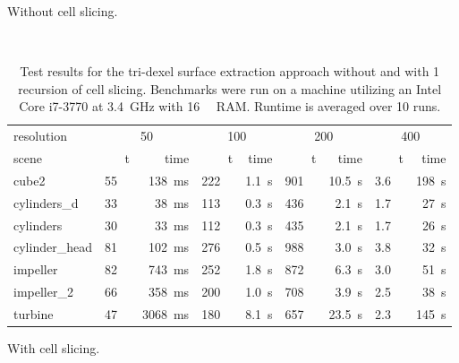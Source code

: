 \begin{table}
\begin{subtable}{\textwidth}
		\caption{
			Without cell slicing.
		}
		\label{tbl:tri_dexel_results_no_slicing}
	\end{subtable}
	\bigskip\\
	\begin{subtable}{\textwidth}
		\centering
		\begin{tabular}{l|rr|rr|rr|rr}
			resolution     & \multicolumn{2}{c}{50} & \multicolumn{2}{c}{100} & \multicolumn{2}{c}{200} & \multicolumn{2}{c}{400} \\
			scene          & t\sub{out} & time & t\sub{out} & time & t\sub{out} & time & t\sub{out} & time \\
			\midrule
			cube2          & \SI{55}{\kilo\nothing} & \SI{ 138}{\milli\second} & \SI{222}{\kilo\nothing} & \SI{1.1}{\second} & \SI{901}{\kilo\nothing} & \SI{10.5}{\second} & \SI{3.6}{\mega\nothing} & \SI{198}{\second} \\
			cylinders\_d   & \SI{33}{\kilo\nothing} & \SI{  38}{\milli\second} & \SI{113}{\kilo\nothing} & \SI{0.3}{\second} & \SI{436}{\kilo\nothing} & \SI{ 2.1}{\second} & \SI{1.7}{\mega\nothing} & \SI{ 27}{\second} \\
			cylinders      & \SI{30}{\kilo\nothing} & \SI{  33}{\milli\second} & \SI{112}{\kilo\nothing} & \SI{0.3}{\second} & \SI{435}{\kilo\nothing} & \SI{ 2.1}{\second} & \SI{1.7}{\mega\nothing} & \SI{ 26}{\second} \\
			cylinder\_head & \SI{81}{\kilo\nothing} & \SI{ 102}{\milli\second} & \SI{276}{\kilo\nothing} & \SI{0.5}{\second} & \SI{988}{\kilo\nothing} & \SI{ 3.0}{\second} & \SI{3.8}{\mega\nothing} & \SI{ 32}{\second} \\
			impeller       & \SI{82}{\kilo\nothing} & \SI{ 743}{\milli\second} & \SI{252}{\kilo\nothing} & \SI{1.8}{\second} & \SI{872}{\kilo\nothing} & \SI{ 6.3}{\second} & \SI{3.0}{\mega\nothing} & \SI{ 51}{\second} \\
			impeller\_2    & \SI{66}{\kilo\nothing} & \SI{ 358}{\milli\second} & \SI{200}{\kilo\nothing} & \SI{1.0}{\second} & \SI{708}{\kilo\nothing} & \SI{ 3.9}{\second} & \SI{2.5}{\mega\nothing} & \SI{ 38}{\second} \\
			turbine        & \SI{47}{\kilo\nothing} & \SI{3068}{\milli\second} & \SI{180}{\kilo\nothing} & \SI{8.1}{\second} & \SI{657}{\kilo\nothing} & \SI{23.5}{\second} & \SI{2.3}{\mega\nothing} & \SI{145}{\second} \\
		\end{tabular}
		\caption{
			With cell slicing.
		}
		\label{tbl:tri_dexel_results_slicing}
	\end{subtable}
	\caption{
		Test results for the tri-dexel surface extraction approach without and with 1 recursion of cell slicing.
		Benchmarks were run on a machine utilizing an Intel Core i7-3770 at \SI{3.4}{\giga\hertz} with \SI{16}{\gibi\byte} RAM.
		Runtime is averaged over 10 runs.
	}
	\label{tbl:tri_dexel_results}
\end{table}
